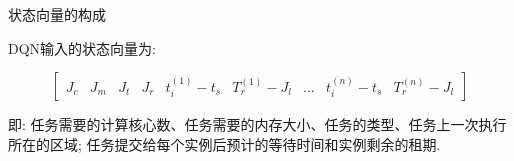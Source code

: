 \begin{frame}{状态向量的构成}

    DQN输入的状态向量为:

    \begin{equation*}
        \begin{bmatrix}
            J_c & J_m & J_t & J_r & t^{(1)}_i - t_s & T^{(1)}_r - J_l & \dots & t^{(n)}_i - t_s & T^{(n)}_r - J_l
        \end{bmatrix}
    \end{equation*}

    即: 任务需要的计算核心数、任务需要的内存大小、任务的类型、任务上一次执行所在的区域; 任务提交给每个实例后预计的等待时间和实例剩余的租期.
\end{frame}
